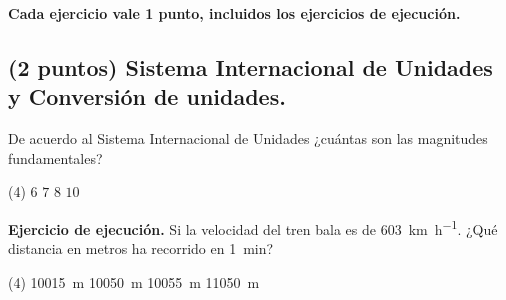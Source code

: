 \documentclass[12pt, letter]{exam}
\begin{document}


\setcounter{page}{3}

\begin{center}
\textbf{Cada ejercicio vale 1 punto, incluidos los ejercicios de ejecución.}
\end{center}

\begin{questions}
    
    \section{(2 puntos) Sistema Internacional de Unidades y Conversión de unidades.}
    
    \question De acuerdo al Sistema Internacional de Unidades ¿cuántas son las magnitudes fundamentales?
    \begin{tasks}(4)
        \task $6$
        \task $7$
        \task $8$
        \task $10$
    \end{tasks}


    \question \label{Ejercicio_01} \textbf{Ejercicio de ejecución.} Si la velocidad del tren bala es de \SI{603}{\kilo\meter\per\hour}. ¿Qué distancia en metros ha recorrido en \SI{1}{\minute}?
    \begin{tasks}(4)
        \task \SI{10015}{\meter}
        \task \SI{10050}{\meter}
        \task \SI{10055}{\meter}
        \task \SI{11050}{\meter}
        

\end{tasks}
\end{questions}
\end{document}
